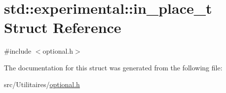 \hypertarget{structstd_1_1experimental_1_1in__place__t}{}\section{std\+:\+:experimental\+:\+:in\+\_\+place\+\_\+t Struct Reference}
\label{structstd_1_1experimental_1_1in__place__t}


{\ttfamily \#include $<$optional.\+h$>$}



The documentation for this struct was generated from the following file\+:\begin{DoxyCompactItemize}
\item 
src/\+Utilitaires/\mbox{\hyperlink{optional_8h}{optional.\+h}}\end{DoxyCompactItemize}
